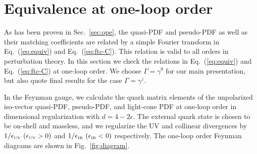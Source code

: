 \section{Equivalence at one-loop order}
\label{sec:equiv}

As has been proven in Sec.~\ref{sec:ope}, the quasi-PDF and pseudo-PDF as well as their matching coefficients are related by a simple Fourier transform in Eq.~(\ref{eq:equiv}) and Eq.~(\ref{eq:ftc-C}). This relation is valid to all orders in perturbation theory. In this section we check the relations in Eq.~(\ref{eq:equiv}) and Eq.~(\ref{eq:ftc-C}) at one-loop order. We choose $\Gamma=\gamma^0$ for our main presentation, but also quote final results for the case $\Gamma=\gamma^z$.

In the Feynman gauge, we calculate the quark matrix elements of the unpolarized iso-vector quasi-PDF, pseudo-PDF, and light-cone PDF at one-loop order in dimensional
regularization with $d=4-2\epsilon$. The external quark state is chosen to be on-shell and massless, and we regularize the UV and collinear divergences by $1/\epsilon_{\mbox{\tiny UV}}\ (\epsilon_{\mbox{\tiny UV}}>0)$ and $1/\epsilon_{\mbox{\tiny IR}}\ (\epsilon_{\mbox{\tiny IR}}<0)$ respectively. The one-loop order Feynman diagrams are shown in Fig.~\ref{fig:diagram}.


